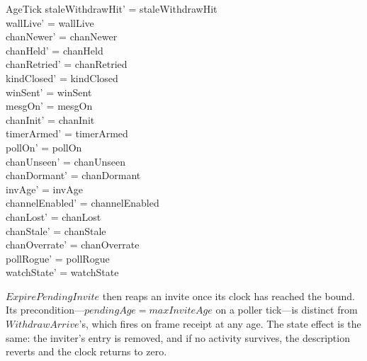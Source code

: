\documentclass[a4paper,10pt,fleqn]{article}
\begin{document}
\begin{schema}{AgeTick}
  staleWithdrawHit' = staleWithdrawHit \\
  wallLive' = wallLive \\
  chanNewer' = chanNewer \\
  chanHeld' = chanHeld \\
  chanRetried' = chanRetried \\
  kindClosed' = kindClosed \\
  winSent' = winSent \\
  mesgOn' = mesgOn \\
  chanInit' = chanInit \\
  timerArmed' = timerArmed \\
  pollOn' = pollOn \\
  chanUnseen' = chanUnseen \\
  chanDormant' = chanDormant \\
  invAge' = invAge \\
  channelEnabled' = channelEnabled \\
  chanLost' = chanLost \\
  chanStale' = chanStale \\
  chanOverrate' = chanOverrate \\
  pollRogue' = pollRogue \\
  watchState' = watchState
\end{schema}

$ExpirePendingInvite$ then reaps an invite once its clock has reached the
bound.  Its precondition---$pendingAge = maxInviteAge$ on a poller
tick---is distinct from $WithdrawArrive$'s, which fires on frame receipt at
any age.  The state effect is the same: the inviter's entry is removed, and
if no activity survives, the description reverts and the clock returns to
zero.
\end{document}

